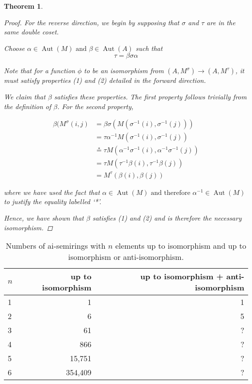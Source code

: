 \documentclass{article}
\newtheorem{theorem}{Theorem}
\begin{document}
\begin{theorem}
\begin{proof}
    For the reverse direction, we begin by supposing that \(\sigma\) and \(\tau\) are in the same double coset.

    Choose \(\alpha\in\operatorname{Aut}(M)\text{ and } \beta\in\operatorname{Aut}(A)\) such that 
    \[\tau=\beta\sigma\alpha\]

    Note that for a function \(\phi\) to be an isomorphism from \((A,M^\sigma)\to(A, M^\tau)\), it must satisfy properties (1) and (2) detailed in the forward direction.

    We claim that \(\beta\) satisfies these properties. The first property follows trivially from the definition of \(\beta\). For the second property, 

    \begin{align*}
        \beta(M^\sigma(i,j)&=\beta\sigma(M(\sigma^{-1}(i),\sigma^{-1}(j)))\\
        &=\tau\alpha^{-1}M(\sigma^{-1}(i),\sigma^{-1}(j))\\
        &\overset{*}{=}\tau M(\alpha^{-1}\sigma^{-1}(i),\alpha^{-1}\sigma^{-1}(j))\\
        &=\tau M(\tau^{-1}\beta(i),\tau^{-1}\beta(j))\\
        &=M^\tau(\beta(i),\beta(j))
    \end{align*}

    where we have used the fact that \(\alpha\in\operatorname{Aut}(M)\text{ and therefore }\alpha^{-1}\in\operatorname{Aut}(M)\) to justify the equality labelled `*'.

    Hence, we have shown that \(\beta\) satisfies (1) and (2) and is therefore the necessary isomorphism.
\end{proof}





  
\end{theorem}

\begin{table}[h]
  \centering
  \begin{tabular}{l|r|r}
    \toprule
    $n$ & up to isomorphism & up to isomorphism + anti-isomorphism \\
    \midrule
    1 & 1      & 1 \\
    2 & 6      & 5 \\
    3 & 61     & ? \\
    4 & 866    & ? \\
    5 & 15,751 & ? \\
    6 & 354,409 & ? \\
  \end{tabular}
  \caption{Numbers of ai-semirings with $n$ elements up to isomorphism and up
  to isomorphism or anti-isomorphism.}
  \label{tab:example}
\end{table}
\end{document}
